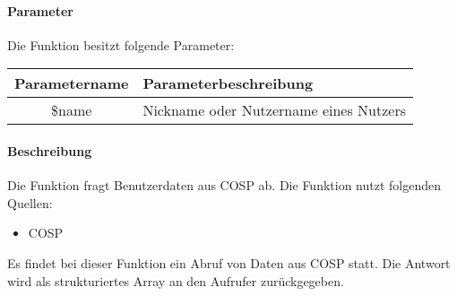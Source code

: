 \paragraph{Parameter} Die Funktion besitzt folgende Parameter:
\begin{table}[H]
	\begin{tabular}{|c|p{11cm}|}
		\hline
		\textbf{Parametername} & \textbf{Parameterbeschreibung} \\ \hline
		\$name & Nickname oder Nutzername eines Nutzers \\ \hline
	\end{tabular}
\end{table}
\paragraph{Beschreibung} Die Funktion fragt Benutzerdaten aus {\glqq COSP\grqq} ab. Die Funktion nutzt folgenden Quellen:
\begin{itemize}
	\item COSP
\end{itemize}
Es findet bei dieser Funktion ein Abruf von Daten aus {\glqq COSP\grqq} statt. Die Antwort wird als strukturiertes Array an den Aufrufer zurückgegeben.
